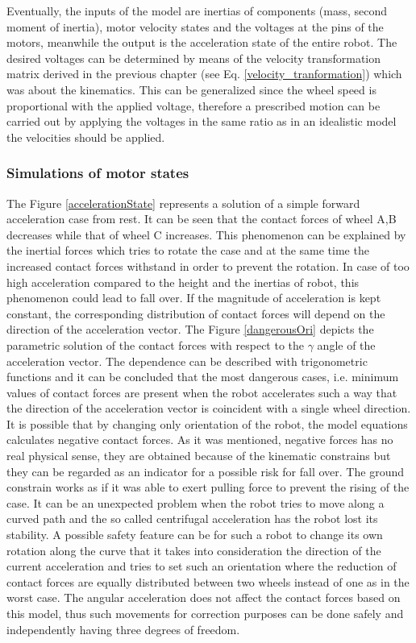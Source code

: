 \documentclass[12pt,english]{article}
\begin{document}
Eventually, the inputs of the model are inertias of components (mass, second moment of inertia), motor velocity states and the voltages at the pins of the motors, meanwhile the output is the acceleration state of the entire robot. The desired voltages can be determined by means of the velocity transformation matrix derived in the previous chapter (see Eq. \ref{velocity_tranformation}) which was about the kinematics. This can be generalized since the wheel speed is proportional with the applied voltage, therefore a prescribed motion can be carried out by applying the voltages in the same ratio as in an idealistic model the velocities should be applied.

\subsubsection{Simulations of motor states}
The Figure \ref{accelerationState} represents a solution of a simple forward acceleration case from rest. It can be seen that the contact forces of wheel A,B decreases while that of wheel C increases. This phenomenon can be explained by the inertial forces which tries to rotate the case and at the same time the increased contact forces withstand in order to prevent the rotation. In case of too high acceleration compared to the height and the inertias of robot, this phenomenon could lead to fall over. 
If the magnitude of acceleration is kept constant, the corresponding distribution of contact forces will depend on the direction of the acceleration vector.
The Figure \ref{dangerousOri} depicts the parametric solution of the contact forces with respect to the $\gamma$ angle of the acceleration vector. The dependence can be described with trigonometric functions and it can be concluded that the most dangerous cases, i.e. minimum values of contact forces are present when the robot accelerates such a way that the direction of the acceleration vector is coincident with a single wheel direction. It is possible that by changing only orientation of the robot, the model equations calculates negative contact forces. As it was mentioned, negative forces has no real physical sense, they are obtained because of the kinematic constrains but they can be regarded as an indicator for a possible risk for fall over. The ground constrain works as if it was able to exert pulling force to prevent the rising of the case. It can be an unexpected problem when the robot tries to move along a curved path and the so called centrifugal acceleration has the robot lost its stability. A possible safety feature can be for such a robot to change its own rotation along the curve that it takes into consideration the direction of the current acceleration and tries to set such an orientation where the reduction of contact forces are equally distributed between two wheels instead of one as in the worst case. The angular acceleration does not affect the contact forces based on this model, thus such movements for correction purposes can be done safely and independently having three degrees of freedom.
\end{document}
